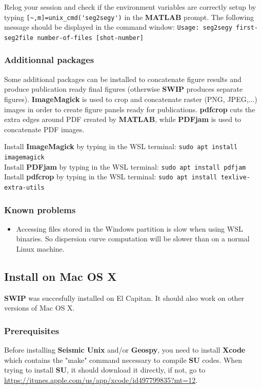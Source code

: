 \documentclass[twoside,a4paper]{article}
\def\SWIP{\textbf{SWIP}}
\def\SU{\textbf{SU}}
\def\SeismicUnix{\textbf{Seismic Unix}}
\def\Geopsy{\textbf{Geospy}}
\def\ImageMagick{\textbf{ImageMagick}}
\def\PDFjam{\textbf{PDFjam}}
\def\pdfcrop{\textbf{pdfcrop}}
\def\MATLAB{\textbf{MATLAB}}
\begin{document}
Relog your session and check if the environment variables are correctly setup by typing \verb|[~,m]=unix_cmd('seg2segy')| in the {\MATLAB} prompt. The following message should be displayed in the command window: \verb|Usage: seg2segy first-seg2file number-of-files [shot-number]|


\subsubsection{Additionnal packages}
\label{subsec:WinExtra}
Some additional packages can be installed to concatenate figure results and produce publication ready final figures (otherwise {\SWIP} produces separate figures). {\ImageMagick} is used to crop and concatenate raster (PNG, JPEG,...) images in order to create figure panels ready for publications. {\pdfcrop} cuts the extra edges around PDF created by {\MATLAB}, while {\PDFjam} is used to concatenate PDF images.

Install {\ImageMagick} by typing in the WSL terminal: \verb|sudo apt install imagemagick|\\
Install {\PDFjam} by typing in the WSL terminal: \verb|sudo apt install pdfjam|\\
Install {\pdfcrop} by typing in the WSL terminal: \verb|sudo apt install texlive-extra-utils|

\subsubsection{Known problems}
\begin{itemize}
\setlength\itemsep{2ex}
\setlength{\parindent}{5ex}
\item Accessing files stored in the Windows partition is slow when using WSL binaries. So dispersion curve computation will be slower than on a normal Linux machine.

\end{itemize}

\clearpage
\subsection{Install on Mac OS X}
{\SWIP} was succesfully installed on El Capitan. It should also work on other versions of Mac OS X.

\subsubsection{Prerequisites}
Before installing {\SeismicUnix} and/or {\Geopsy}, you need to install \textbf{Xcode} which contains the "make" command necessary to compile {\SU} codes. When trying to install {\SU}, it should download it directly, if not, go to \url{https://itunes.apple.com/us/app/xcode/id497799835?mt=12}.
\end{document}
